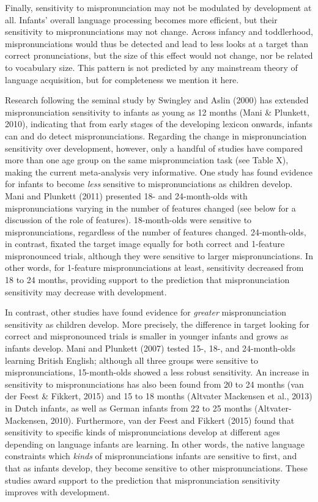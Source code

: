 \documentclass[man]{apa6}
\theoremstyle{definition}
\theoremstyle{definition}
\theoremstyle{definition}
\theoremstyle{remark}
\begin{document}
Finally, sensitivity to mispronunciation may not be modulated by
development at all. Infants' overall language processing becomes more
efficient, but their sensitivity to mispronunciations may not change.
Across infancy and toddlerhood, mispronunciations would thus be detected
and lead to less looks at a target than correct pronunciations, but the
size of this effect would not change, nor be related to vocabulary size.
This pattern is not predicted by any mainstream theory of language
acquisition, but for completeness we mention it here.

Research following the seminal study by Swingley and Aslin (2000) has
extended mispronunciation sensitivity to infants as young as 12 months
(Mani \& Plunkett, 2010), indicating that from early stages of the
developing lexicon onwards, infants can and do detect mispronunciations.
Regarding the change in mispronunciation sensitivity over development,
however, only a handful of studies have compared more than one age group
on the same mispronunciation task (see Table X), making the current
meta-analysis very informative. One study has found evidence for infants
to become \emph{less} sensitive to mispronunciations as children
develop. Mani and Plunkett (2011) presented 18- and 24-month-olds with
mispronunciations varying in the number of features changed (see below
for a discussion of the role of features). 18-month-olds were sensitive
to mispronunciations, regardless of the number of features changed.
24-month-olds, in contrast, fixated the target image equally for both
correct and 1-feature mispronounced trials, although they were sensitive
to larger mispronunciations. In other words, for 1-feature
mispronunciations at least, sensitivity decreased from 18 to 24 months,
providing support to the prediction that mispronunciation sensitivity
may decrease with development.

In contrast, other studies have found evidence for \emph{greater}
mispronunciation sensitivity as children develop. More precisely, the
difference in target looking for correct and mispronounced trials is
smaller in younger infants and grows as infants develop. Mani and
Plunkett (2007) tested 15-, 18-, and 24-month-olds learning British
English; although all three groups were sensitive to mispronunciations,
15-month-olds showed a less robust sensitivity. An increase in
sensitivity to mispronunciations has also been found from 20 to 24
months (van der Feest \& Fikkert, 2015) and 15 to 18 months (Altvater
Mackensen et al., 2013) in Dutch infants, as well as German infants from
22 to 25 months (Altvater-Mackensen, 2010). Furthermore, van der Feest
and Fikkert (2015) found that sensitivity to specific kinds of
mispronunciations develop at different ages depending on language
infants are learning. In other words, the native language constraints
which \emph{kinds} of mispronunciations infants are sensitive to first,
and that as infants develop, they become sensitive to other
mispronunciations. These studies award support to the prediction that
mispronunciation sensitivity improves with development.
\end{document}
